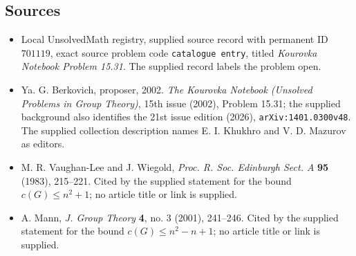 \documentclass[11pt]{article}
\begin{document}
\subsection{Sources}
\begin{itemize}
\item Local UnsolvedMath registry, supplied source record with permanent ID \(701119\), exact source problem code \texttt{catalogue entry}, titled \emph{Kourovka Notebook Problem 15.31}. The supplied record labels the problem open.
\item Ya. G. Berkovich, proposer, 2002. \emph{The Kourovka Notebook (Unsolved Problems in Group Theory)}, 15th issue (2002), Problem 15.31; the supplied background also identifies the 21st issue edition (2026), \texttt{arXiv:1401.0300v48}. The supplied collection description names E. I. Khukhro and V. D. Mazurov as editors.
\item M. R. Vaughan-Lee and J. Wiegold, \emph{Proc. R. Soc. Edinburgh Sect. A} \textbf{95} (1983), 215--221. Cited by the supplied statement for the bound \(c(G)\le n^2+1\); no article title or link is supplied.
\item A. Mann, \emph{J. Group Theory} \textbf{4}, no. 3 (2001), 241--246. Cited by the supplied statement for the bound \(c(G)\le n^2-n+1\); no article title or link is supplied.
\end{itemize}
\end{document}
